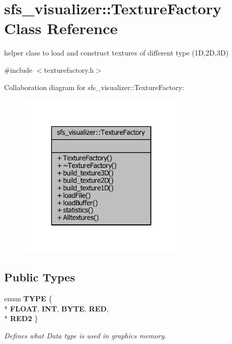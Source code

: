 \section{sfs\-\_\-visualizer\-:\-:Texture\-Factory Class Reference}
\label{classsfs__visualizer_1_1TextureFactory}


helper class to load and construct textures of different type (1\-D,2\-D,3\-D)  




{\ttfamily \#include $<$texturefactory.\-h$>$}



Collaboration diagram for sfs\-\_\-visualizer\-:\-:Texture\-Factory\-:
\nopagebreak
\begin{figure}[H]
\begin{center}
\leavevmode
\includegraphics[width=226pt]{db/df0/classsfs__visualizer_1_1TextureFactory__coll__graph}
\end{center}
\end{figure}
\subsection*{Public Types}
\begin{DoxyCompactItemize}
\item 
enum {\bf T\-Y\-P\-E} \{ \\*
{\bfseries F\-L\-O\-A\-T}, 
{\bfseries I\-N\-T}, 
{\bfseries B\-Y\-T\-E}, 
{\bfseries R\-E\-D}, 
\\*
{\bfseries R\-E\-D2}
 \}
\begin{DoxyCompactList}\small\item\em Defines what Data type is used in graphics memory. \end{DoxyCompactList}\end{DoxyCompactItemize}

